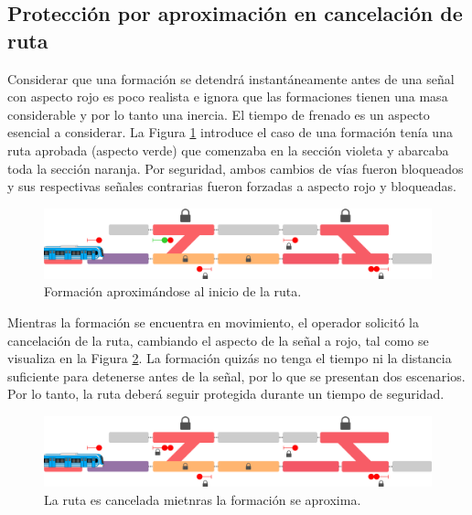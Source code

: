 \subsection{Protección por aproximación en cancelación de ruta}

	Considerar que una formación se detendrá instantáneamente antes de una señal con aspecto rojo es poco realista e ignora que las formaciones tienen una masa considerable y por lo tanto una inercia. El tiempo de frenado es un aspecto esencial a considerar. La Figura \ref{fig:ACG_aproximacion_1} introduce el caso de una formación tenía una ruta aprobada (aspecto verde) que comenzaba en la sección violeta y abarcaba toda la sección naranja. Por seguridad, ambos cambios de vías fueron bloqueados y sus respectivas señales contrarias fueron forzadas a aspecto rojo y bloqueadas.

    \begin{figure}[!h]
        \centering
        \includegraphics[width=1\textwidth]{Figuras/aproximacion_1}
        \centering\caption{Formación aproximándose al inicio de la ruta.}
        \label{fig:ACG_aproximacion_1}
    \end{figure}
    
    Mientras la formación se encuentra en movimiento, el operador solicitó la cancelación de la ruta, cambiando el aspecto de la señal a rojo, tal como se visualiza en la Figura \ref{fig:ACG_aproximacion_2}. La formación quizás no tenga el tiempo ni la distancia suficiente para detenerse antes de la señal, por lo que se presentan dos escenarios. Por lo tanto, la ruta deberá seguir protegida durante un tiempo de seguridad.
    
    \begin{figure}[!h]
        \centering
        \includegraphics[width=1\textwidth]{Figuras/aproximacion_2}
        \centering\caption{La ruta es cancelada mietnras la formación se aproxima.}
        \label{fig:ACG_aproximacion_2}
    \end{figure}
    
